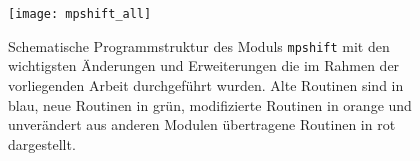 \begin{figure}[ht!]
	\centering
	\texttt{[image: mpshift\_all]}
	\captionsetup{figurewithin = chapter}
	\captionsetup{font=small, labelfont=bf}\caption[Neue schematische Programmstruktur des Moduls \texttt{mpshift}]{Schematische Programmstruktur des Moduls \texttt{mpshift} mit den wichtigsten Änderungen und Erweiterungen die im Rahmen der vorliegenden Arbeit durchgeführt wurden. Alte Routinen sind in blau, neue Routinen in grün, modifizierte Routinen in orange und unverändert aus anderen Modulen übertragene Routinen in rot dargestellt.}
\label{abb:neue_programmstruktur}
\end{figure}